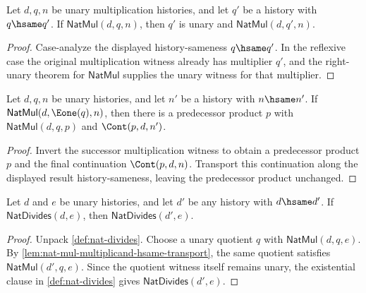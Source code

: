 \begin{lemma}
\label{lem:natmul-multiplier-hsame-transport}
Let $d,q,n$ be unary multiplication histories, and let $q'$ be a history with
$q\hsame q'$. If $\mathsf{NatMul}(d,q,n)$, then $q'$ is unary and
$\mathsf{NatMul}(d,q',n)$.
\end{lemma}
\begin{proof}
Case-analyze the displayed history-sameness $q\hsame q'$. In the reflexive
case the original multiplication witness already has multiplier $q'$, and the
right-unary theorem for $\mathsf{NatMul}$ supplies the unary witness for that
multiplier.
\end{proof}

\begin{lemma}
\label{lem:nat-mul-succ-result-cont-transport}
Let $d,q,n$ be unary histories, and let $n'$ be a history with $n\hsame n'$. If $\mathsf{NatMul}(d,\Eone(q),n)$, then there is a predecessor product $p$ with $\mathsf{NatMul}(d,q,p)$ and $\Cont(p,d,n')$.
\end{lemma}
\begin{proof}
Invert the successor multiplication witness to obtain a predecessor product $p$ and the final continuation $\Cont(p,d,n)$. Transport this continuation along the displayed result history-sameness, leaving the predecessor product unchanged.
\end{proof}

\begin{theorem}
\label{thm:nat-divides-divisor-hsame-transport}
Let $d$ and $e$ be unary histories, and let $d'$ be any history with $d\hsame d'$. If $\mathsf{NatDivides}(d,e)$, then $\mathsf{NatDivides}(d',e)$.
\end{theorem}
\begin{proof}
Unpack \autoref{def:nat-divides}. Choose a unary quotient $q$ with $\mathsf{NatMul}(d,q,e)$. By \autoref{lem:nat-mul-multiplicand-hsame-transport}, the same quotient satisfies $\mathsf{NatMul}(d',q,e)$. Since the quotient witness itself remains unary, the existential clause in \autoref{def:nat-divides} gives $\mathsf{NatDivides}(d',e)$.
\end{proof}

